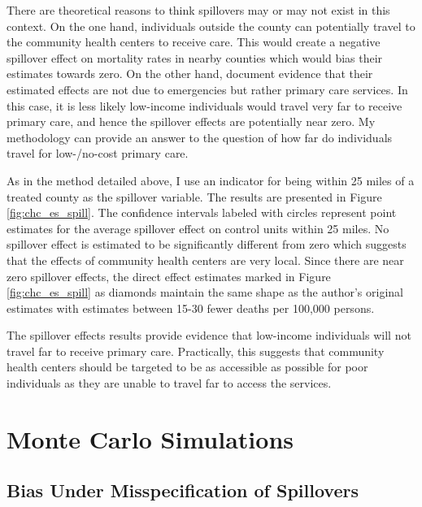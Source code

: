 \documentclass[11pt]{article}
\begin{document}
There are theoretical reasons to think spillovers may or may not exist in this context. On the one hand, individuals outside the county can potentially travel to the community health centers to receive care. This would create a negative spillover effect on mortality rates in nearby counties which would bias their estimates towards zero. On the other hand, \citet{Bailey_Goodman_Bacon_2015} document evidence that their estimated effects are not due to emergencies but rather primary care services. In this case, it is less likely low-income individuals would travel very far to receive primary care, and hence the spillover effects are potentially near zero. My methodology can provide an answer to the question of how far do individuals travel for low-/no-cost primary care.

As in the method detailed above, I use an indicator for being within 25 miles of a treated county as the spillover variable. The results are presented in Figure \ref{fig:chc_es_spill}. The confidence intervals labeled with circles represent point estimates for the average spillover effect on control units within 25 miles. No spillover effect is estimated to be significantly different from zero which suggests that the effects of community health centers are very local. Since there are near zero spillover effects, the direct effect estimates marked in Figure \ref{fig:chc_es_spill} as diamonds maintain the same shape as the author's original estimates with estimates between 15-30 fewer deaths per 100,000 persons. 

The spillover effects results provide evidence that low-income individuals will not travel far to receive primary care. Practically, this suggests that community health centers should be targeted to be as accessible as possible for poor individuals as they are unable to travel far to access the services. 




\section{Monte Carlo Simulations}

\subsection{Bias Under Misspecification of Spillovers}
\end{document}
